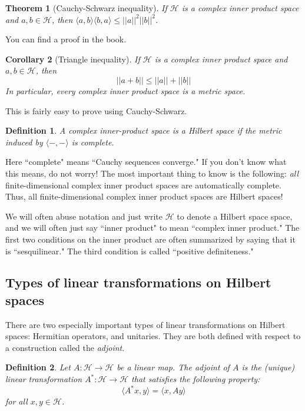 \documentclass{article}
\newtheorem{thm}{Theorem}
\newtheorem*{dfn}{Definition}
\newtheorem{cor}[thm]{Corollary}
\newcommand{\calH}{\mathcal{H}}
\begin{document}
\begin{thm}[Cauchy-Schwarz inequality]
If $\calH$ is a complex inner product space and $a,b \in \calH$, then $\langle a, b\rangle\langle b, a\rangle \leq ||a||^2 ||b||^2$.
\end{thm}

You can find a proof in the book.

\begin{cor}[Triangle inequality] 
If $\calH$ is a complex inner product space and $a,b \in \calH$, then
\[||a + b|| \leq ||a|| + ||b||\]
In particular, every complex inner product space is a metric space. 
\end{cor}

This is fairly easy to prove using Cauchy-Schwarz.

\begin{dfn}
	A complex inner-product space is a \emph{Hilbert space} if the metric induced by $\langle-, -\rangle$ is {\em complete}.
\end{dfn}

Here ``complete" means ``Cauchy sequences converge."  If you don't know what this means, do not worry!  The most important thing to know is the following: {\em all} finite-dimensional complex inner product spaces are automatically complete.  Thus, all finite-dimensional complex inner product spaces are Hilbert spaces!

We will often abuse notation and just write $\calH$ to denote a Hilbert space space, and we will often just say ``inner product" to mean ``complex inner product."  The first two conditions on the inner product are often summarized by saying that it is ``sesquilinear."  The third condition is called ``positive definiteness."


\subsection{Types of linear transformations on Hilbert spaces}
There are two especially important types of linear transformations on Hilbert spaces: Hermitian operators, and unitaries.  They are both defined with respect to a construction called the \emph{adjoint}.

\begin{dfn}
Let $A:\mathcal{H}\to\mathcal{H}$ be a linear map.
The {\em adjoint} of $A$ is the (unique) linear transformation
$A^* : \calH \to \calH$ that satisfies the following property:
\[ \langle A^*x,y\rangle = \langle x, Ay\rangle\]
for all $x,y \in \calH$.
\end{dfn}
\end{document}
